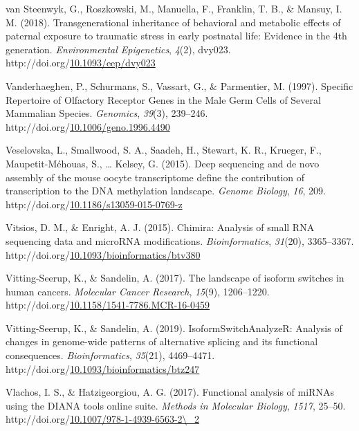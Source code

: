 \documentclass[12pt,twoside]{reedthesis}
\newlength{\cslhangindent}
\newenvironment{CSLReferences}[2] %
 {%
  \setlength{\parindent}{0pt}
  \ifodd #1 \everypar{\setlength{\hangindent}{\cslhangindent}}\ignorespaces\fi
  \ifnum #2 > 0
  \setlength{\parskip}{#2\baselineskip}
  \fi
 }%
 {}
\begin{document}
\begin{CSLReferences}{1}{0}
\leavevmode{}%
van Steenwyk, G., Roszkowski, M., Manuella, F., Franklin, T. B., \& Mansuy, I. M. (2018). Transgenerational inheritance of behavioral and metabolic effects of paternal exposure to traumatic stress in early postnatal life: Evidence in the 4th generation. \emph{Environmental Epigenetics}, \emph{4}(2), dvy023. http://doi.org/\href{https://doi.org/10.1093/eep/dvy023}{10.1093/eep/dvy023}

\leavevmode{}%
Vanderhaeghen, P., Schurmans, S., Vassart, G., \& Parmentier, M. (1997). Specific Repertoire of Olfactory Receptor Genes in the Male Germ Cells of Several Mammalian Species. \emph{Genomics}, \emph{39}(3), 239--246. http://doi.org/\href{https://doi.org/10.1006/geno.1996.4490}{10.1006/geno.1996.4490}

\leavevmode{}%
Veselovska, L., Smallwood, S. A., Saadeh, H., Stewart, K. R., Krueger, F., Maupetit-Méhouas, S., \ldots{} Kelsey, G. (2015). Deep sequencing and de novo assembly of the mouse oocyte transcriptome define the contribution of transcription to the DNA methylation landscape. \emph{Genome Biology}, \emph{16}, 209. http://doi.org/\href{https://doi.org/10.1186/s13059-015-0769-z}{10.1186/s13059-015-0769-z}

\leavevmode{}%
Vitsios, D. M., \& Enright, A. J. (2015). Chimira: Analysis of small RNA sequencing data and microRNA modifications. \emph{Bioinformatics}, \emph{31}(20), 3365--3367. http://doi.org/\href{https://doi.org/10.1093/bioinformatics/btv380}{10.1093/bioinformatics/btv380}

\leavevmode{}%
Vitting-Seerup, K., \& Sandelin, A. (2017). The landscape of isoform switches in human cancers. \emph{Molecular Cancer Research}, \emph{15}(9), 1206--1220. http://doi.org/\href{https://doi.org/10.1158/1541-7786.MCR-16-0459}{10.1158/1541-7786.MCR-16-0459}

\leavevmode{}%
Vitting-Seerup, K., \& Sandelin, A. (2019). IsoformSwitchAnalyzeR: Analysis of changes in genome-wide patterns of alternative splicing and its functional consequences. \emph{Bioinformatics}, \emph{35}(21), 4469--4471. http://doi.org/\href{https://doi.org/10.1093/bioinformatics/btz247}{10.1093/bioinformatics/btz247}

\leavevmode{}%
Vlachos, I. S., \& Hatzigeorgiou, A. G. (2017). Functional analysis of {miRNAs} using the {DIANA} tools online suite. \emph{Methods in Molecular Biology}, \emph{1517}, 25--50. http://doi.org/\href{https://doi.org/10.1007/978-1-4939-6563-2/_2}{10.1007/978-1-4939-6563-2\textbackslash\_2}


\end{CSLReferences}
\end{document}
